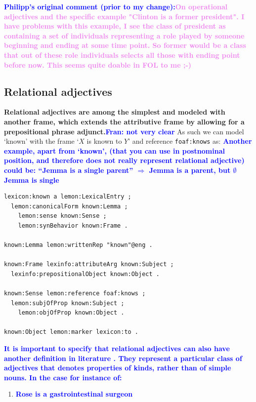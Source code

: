 \documentclass[11pt]{article}
\begin{document}
{\textbf{\textcolor{blue}{Philipp's original comment (prior to my change):}\textcolor{violet}{On operational adjectives and the specific example "Clinton is a former president".
I have problems with this example, I see the class of president as containing a set of individuals representing a role played by someone beginning and ending at some time point.
So former would be a class that out of these role individuals selects all those with ending point before now. This seems quite doable in FOL to me ;-)}}

\subsection{Relational adjectives}

\textbf{Relational adjectives are among the simplest and modeled with another frame,
which extends the attributive frame by allowing for a prepositional phrase
adjunct.\textcolor{blue}{Fran: not very clear}} As such we can model `known' with the frame `$X$ is known to $Y$' and
reference {\tt foaf:knows} as:
\textbf{\textcolor{blue}{Another example, apart from `known', (that you can use in postnominal position, and therefore does not really represent relational adjective) could be: ``Jemma is a single parent'' $\Rightarrow$ Jemma is a parent, but $\emptyset$ Jemma is single}}


\begin{verbatim}
lexicon:known a lemon:LexicalEntry ;
  lemon:canonicalForm known:Lemma ;
	lemon:sense known:Sense ;
	lemon:synBehavior known:Frame .

known:Lemma lemon:writtenRep "known"@eng .

known:Frame lexinfo:attributeArg known:Subject ;
  lexinfo:prepositionalObject known:Object .

known:Sense lemon:reference foaf:knows ;
  lemon:subjOfProp known:Subject ;
	lemon:objOfProp known:Object .
	
known:Object lemon:marker lexicon:to .
\end{verbatim}

\textbf{\textcolor{blue}{It is important to specify that relational adjectives can also have another definition in literature \cite{morzycki2013nonscales}. They represent a particular class of adjectives that denotes properties of kinds, rather than of simple nouns. In the case for instance of:}}

\begin{enumerate}[resume]
\item \textbf{\textcolor{blue}{Rose is a gastrointestinal surgeon}} \label{ex:gastro}
\end{enumerate}

}
\end{document}
